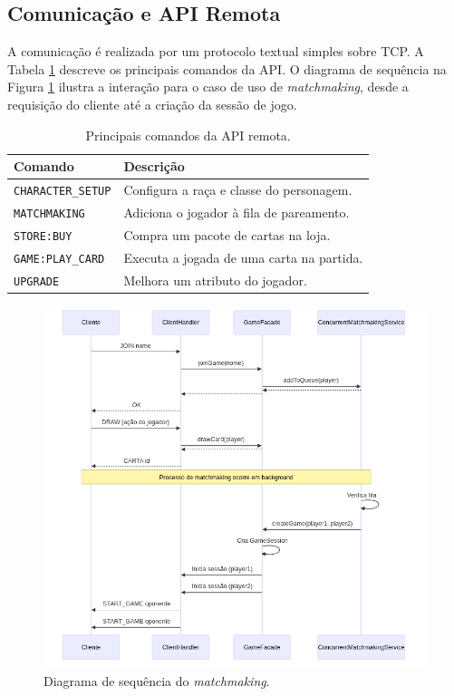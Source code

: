 \documentclass[corpo=12pt,a4paper]{sbc-artigos}
\begin{document}
\subsection{Comunicação e API Remota}
A comunicação é realizada por um protocolo textual simples sobre TCP. A Tabela \ref{tab:comandos} descreve os principais comandos da API. O diagrama de sequência na Figura \ref{fig:sequencia} ilustra a interação para o caso de uso de \textit{matchmaking}, desde a requisição do cliente até a criação da sessão de jogo.

\begin{table}[h]
\centering
\caption{Principais comandos da API remota.}
\label{tab:comandos}
\begin{tabular}{@{}ll@{}}
\toprule
Comando & Descrição \\ \midrule
\texttt{CHARACTER\_SETUP} & Configura a raça e classe do personagem. \\ 
\texttt{MATCHMAKING} & Adiciona o jogador à fila de pareamento. \\ 
\texttt{STORE:BUY} & Compra um pacote de cartas na loja. \\ 
\texttt{GAME:PLAY\_CARD} & Executa a jogada de uma carta na partida. \\ 
\texttt{UPGRADE} & Melhora um atributo do jogador. \\ 
\bottomrule
\end{tabular}
\end{table}

\begin{figure}[h]
\centering
\includegraphics[width=0.9\columnwidth]{figuras/sequencia.png}
\caption{Diagrama de sequência do \textit{matchmaking}.}
\label{fig:sequencia}
\end{figure}
\end{document}
